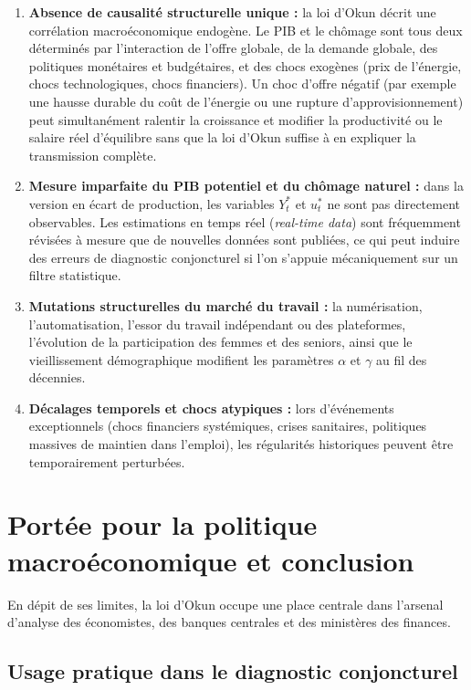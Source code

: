 \documentclass[11pt,a4paper]{article}
\begin{document}
\begin{enumerate}[leftmargin=1.5em]
    \item \textbf{Absence de causalité structurelle unique :} la loi d'Okun décrit une corrélation macroéconomique endogène. Le PIB et le chômage sont tous deux déterminés par l'interaction de l'offre globale, de la demande globale, des politiques monétaires et budgétaires, et des chocs exogènes (prix de l'énergie, chocs technologiques, chocs financiers). Un choc d'offre négatif (par exemple une hausse durable du coût de l'énergie ou une rupture d'approvisionnement) peut simultanément ralentir la croissance et modifier la productivité ou le salaire réel d'équilibre sans que la loi d'Okun suffise à en expliquer la transmission complète.
    \item \textbf{Mesure imparfaite du PIB potentiel et du chômage naturel :} dans la version en écart de production, les variables $Y_t^*$ et $u_t^*$ ne sont pas directement observables. Les estimations en temps réel (\textit{real-time data}) sont fréquemment révisées à mesure que de nouvelles données sont publiées, ce qui peut induire des erreurs de diagnostic conjoncturel si l'on s'appuie mécaniquement sur un filtre statistique.
    \item \textbf{Mutations structurelles du marché du travail :} la numérisation, l'automatisation, l'essor du travail indépendant ou des plateformes, l'évolution de la participation des femmes et des seniors, ainsi que le vieillissement démographique modifient les paramètres $\alpha$ et $\gamma$ au fil des décennies.
    \item \textbf{Décalages temporels et chocs atypiques :} lors d'événements exceptionnels (chocs financiers systémiques, crises sanitaires, politiques massives de maintien dans l'emploi), les régularités historiques peuvent être temporairement perturbées.
\end{enumerate}

\section{Portée pour la politique macroéconomique et conclusion}

En dépit de ses limites, la loi d'Okun occupe une place centrale dans l'arsenal d'analyse des économistes, des banques centrales et des ministères des finances.

\subsection{Usage pratique dans le diagnostic conjoncturel}
\end{document}
